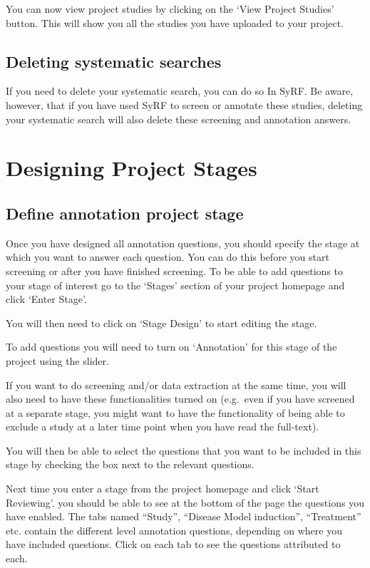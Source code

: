 \documentclass[
]{book}
\begin{document}
You can now view project studies by clicking on the `View Project Studies' button. This will show you all the studies you have uploaded to your project.

\hypertarget{deleting-systematic-searches}{%
\section{Deleting systematic searches}\label{deleting-systematic-searches}}

If you need to delete your systematic search, you can do so In SyRF. Be aware, however, that if you have used SyRF to screen or annotate these studies, deleting your systematic search will also delete these screening and annotation answers.

\hypertarget{stages}{%
\chapter{Designing Project Stages}\label{stages}}

\hypertarget{define-annotation-project-stage}{%
\section{Define annotation project stage}\label{define-annotation-project-stage}}

Once you have designed all annotation questions, you should specify the stage at which you want to answer each question. You can do this before you start screening or after you have finished screening.
To be able to add questions to your stage of interest go to the `Stages' section of your project homepage and click `Enter Stage'.

You will then need to click on `Stage Design' to start editing the stage.

To add questions you will need to turn on `Annotation' for this stage of the project using the slider.

If you want to do screening and/or data extraction at the same time, you will also need to have these functionalities turned on (e.g.~even if you have screened at a separate stage, you might want to have the functionality of being able to exclude a study at a later time point when you have read the full-text).

You will then be able to select the questions that you want to be included in this stage by checking the box next to the relevant questions.

Next time you enter a stage from the project homepage and click `Start Reviewing'. you should be able to see at the bottom of the page the questions you have enabled. The tabs named ``Study'', ``Disease Model induction'', ``Treatment'' etc. contain the different level annotation questions, depending on where you have included questions. Click on each tab to see the questions attributed to each.
\end{document}
